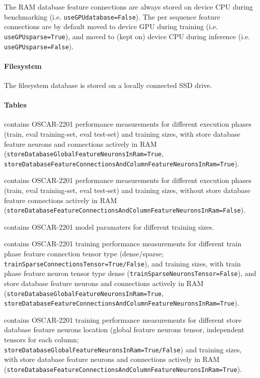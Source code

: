 The RAM database feature connections are always stored on device CPU during benchmarking (i.e. \texttt{useGPUdatabase=False}). The per sequence feature connections are by default moved to device GPU during training (i.e. \texttt{useGPUsparse=True}), and moved to (kept on) device CPU during inference (i.e. \texttt{useGPUsparse=False}).

\paragraph{Filesystem}

The filesystem database is stored on a locally connected SSD drive.

\paragraph{Tables}

 contains OSCAR-2201 performance measurements for different execution phases (train, eval training-set, eval test-set) and training sizes, with store database feature neurons and connections actively in RAM (\texttt{storeDatabaseGlobalFeatureNeuronsInRam=True}, \texttt{storeDatabaseFeatureConnectionsAndColumnFeatureNeuronsInRam=True}).

 contains OSCAR-2201 performance measurements for different execution phases (train, eval training-set, eval test-set) and training sizes, without store database feature connections actively in RAM (\texttt{storeDatabaseFeatureConnectionsAndColumnFeatureNeuronsInRam=False}).

 contains OSCAR-2201 model paramaters for different training sizes.

 contains OSCAR-2201 training performance measurements for different train phase feature connection tensor type (dense/sparse; \texttt{trainSparseConnectionsTensor=True/False}), and training sizes, with train phase feature neuron tensor type dense (\texttt{trainSparseNeuronsTensor=False}), and store database feature neurons and connections actively in RAM (\texttt{storeDatabaseGlobalFeatureNeuronsInRam=True}, \texttt{storeDatabaseFeatureConnectionsAndColumnFeatureNeuronsInRam=True}).

 contains OSCAR-2201 training performance measurements for different store database feature neurons location (global feature neurons tensor, independent tensors for each column; \texttt{storeDatabaseGlobalFeatureNeuronsInRam=True/False}) and training sizes, with store database feature neurons and connections actively in RAM (\texttt{storeDatabaseFeatureConnectionsAndColumnFeatureNeuronsInRam=True}).

